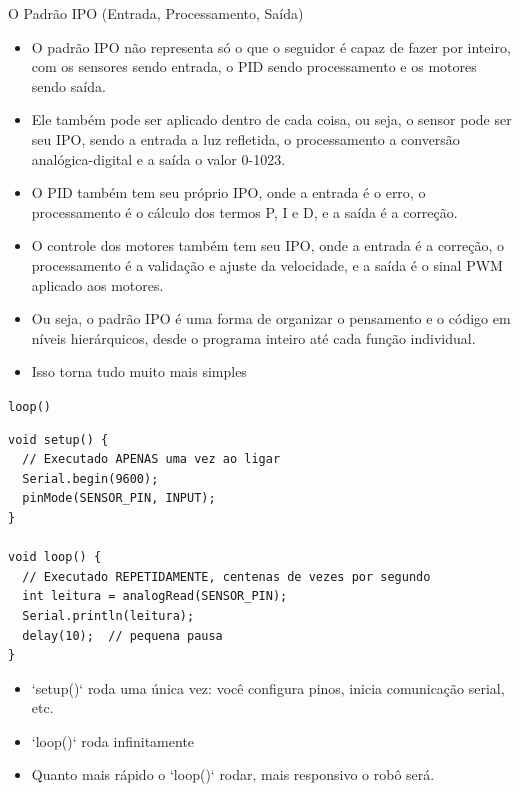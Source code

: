 \documentclass[10pt]{beamer}
\begin{document}
\begin{frame}{O Padrão IPO (Entrada, Processamento, Saída)}
  \begin{itemize}
    \item O padrão IPO não representa só o que o seguidor é capaz de fazer por inteiro, com os sensores sendo entrada, o PID sendo processamento e os motores sendo saída.
    \item Ele também pode ser aplicado dentro de cada coisa, ou seja, o sensor pode ser seu IPO, sendo a entrada a luz refletida, o processamento a conversão analógica-digital e a saída o valor 0-1023.
    \item O PID também tem seu próprio IPO, onde a entrada é o erro, o processamento é o cálculo dos termos P, I e D, e a saída é a correção.
    \item O controle dos motores também tem seu IPO, onde a entrada é a correção, o processamento é a validação e ajuste da velocidade, e a saída é o sinal PWM aplicado aos motores.
    \item Ou seja, o padrão IPO é uma forma de organizar o pensamento e o código em níveis hierárquicos, desde o programa inteiro até cada função individual.
    \item Isso torna tudo muito mais simples
  \end{itemize}
\end{frame}

\begin{frame}[fragile]{\texttt{loop()}}
\begin{lstlisting}
void setup() {
  // Executado APENAS uma vez ao ligar
  Serial.begin(9600);
  pinMode(SENSOR_PIN, INPUT);
}

void loop() {
  // Executado REPETIDAMENTE, centenas de vezes por segundo
  int leitura = analogRead(SENSOR_PIN);
  Serial.println(leitura);
  delay(10);  // pequena pausa
}
\end{lstlisting}

  \begin{itemize}
    \item `setup()` roda uma única vez: você configura pinos, inicia comunicação serial, etc.
    \item `loop()` roda infinitamente
    \item Quanto mais rápido o `loop()` rodar, mais responsivo o robô será.
  \end{itemize}
\end{frame}
\end{document}

